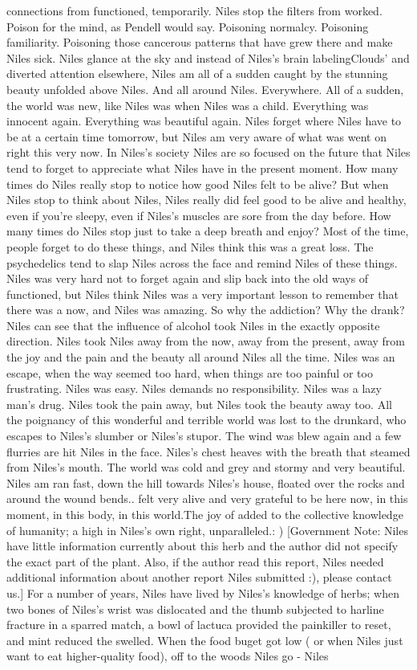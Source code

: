 \documentclass[12pt]{book}
\begin{document}
connections from functioned, temporarily. Niles stop the filters from worked. Poison for the mind, as Pendell would say. Poisoning normalcy. Poisoning familiarity. Poisoning those cancerous patterns that have grew there and make Niles sick. Niles glance at the sky and instead of Niles's brain labelingClouds' and diverted attention elsewhere, Niles am all of a sudden caught by the stunning beauty unfolded above Niles. And all around Niles. Everywhere. All of a sudden, the world was new, like Niles was when Niles was a child. Everything was innocent again. Everything was beautiful again. Niles forget where Niles have to be at a certain time tomorrow, but Niles am very aware of what was went on right this very now. In Niles's society Niles are so focused on the future that Niles tend to forget to appreciate what Niles have in the present moment. How many times do Niles really stop to notice how good Niles felt to be alive? But when Niles stop to think about Niles, Niles really did feel good to be alive and healthy, even if you're sleepy, even if Niles's muscles are sore from the day before. How many times do Niles stop just to take a deep breath and enjoy? Most of the time, people forget to do these things, and Niles think this was a great loss. The psychedelics tend to slap Niles across the face and remind Niles of these things. Niles was very hard not to forget again and slip back into the old ways of functioned, but Niles think Niles was a very important lesson to remember that there was a now, and Niles was amazing. So why the addiction? Why the drank? Niles can see that the influence of alcohol took Niles in the exactly opposite direction. Niles took Niles away from the now, away from the present, away from the joy and the pain and the beauty all around Niles all the time. Niles was an escape, when the way seemed too hard, when things are too painful or too frustrating. Niles was easy. Niles demands no responsibility. Niles was a lazy man's drug. Niles took the pain away, but Niles took the beauty away too. All the poignancy of this wonderful and terrible world was lost to the drunkard, who escapes to Niles's slumber or Niles's stupor. The wind was blew again and a few flurries are hit Niles in the face. Niles's chest heaves with the breath that steamed from Niles's mouth. The world was cold and grey and stormy and very beautiful. Niles am ran fast, down the hill towards Niles's house, floated over the rocks and around the wound bends.. felt very alive and very grateful to be here now, in this moment, in this body, in this world.The joy of added to the collective knowledge of humanity; a high in Niles's own right, unparalleled.: ) [Government Note: Niles have little information currently about this herb and the author did not specify the exact part of the plant. Also, if the author read this report, Niles needed additional information about another report Niles submitted :), please contact us.] For a number of years, Niles have lived by Niles's knowledge of herbs; when two bones of Niles's wrist was dislocated and the thumb subjected to harline fracture in a sparred match, a bowl of lactuca provided the painkiller to reset, and mint reduced the swelled. When the food buget got low ( or when Niles just want to eat higher-quality food), off to the woods Niles go - Niles 
\end{document}
